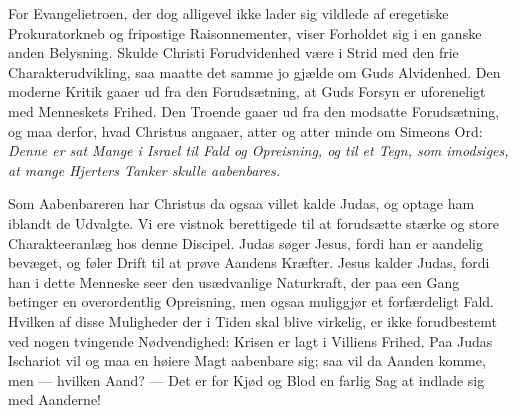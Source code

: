 \documentclass[12pt,a4paper]{book}
\begin{document}
For Evangelietroen, der dog alligevel ikke lader sig vildlede af eregetiske
Prokuratorkneb og fripostige Raisonnementer, viser Forholdet sig i en ganske anden
Belysning. Skulde Christi Forudvidenhed være i Strid med den frie Charakterudvikling,
saa maatte det samme jo gjælde om Guds Alvidenhed. Den moderne Kritik gaaer ud fra den
Forudsætning, at Guds Forsyn er uforeneligt med Menneskets Frihed. Den Troende gaaer ud
fra den modsatte Forudsætning, og maa derfor, hvad Christus angaaer, atter og atter
minde om Simeons Ord: \emph{Denne er sat Mange i Israel til Fald og Opreisning, og til
et Tegn, som imodsiges, at mange Hjerters Tanker skulle aabenbares.}

Som Aabenbareren har Christus da ogsaa villet kalde Judas,
og optage ham iblandt de Udvalgte. Vi ere vistnok berettigede til at forudsætte stærke
og store Charakteeranlæg hos denne Discipel. Judas søger Jesus, fordi han er aandelig
bevæget, og føler Drift til at prøve Aandens Kræfter. Jesus kalder Judas, fordi han i
dette Menneske seer den usædvanlige Naturkraft, der paa een Gang betinger en
overordentlig Opreisning, men ogsaa muliggjør et forfærdeligt Fald. Hvilken af disse
Muligheder der i Tiden skal blive virkelig, er ikke forudbestemt ved nogen tvingende
Nødvendighed: Krisen er lagt i Villiens Frihed. Paa Judas Ischariot vil og maa en høiere
Magt aabenbare sig; saa vil da Aanden komme, men --- hvilken Aand? --- Det er for Kjød
og Blod en farlig Sag at indlade sig med Aanderne!
\end{document}
